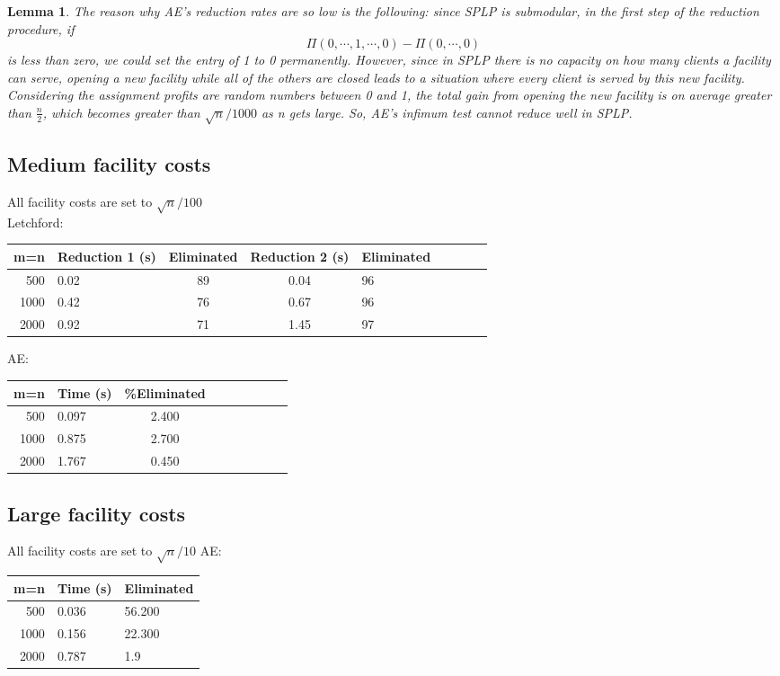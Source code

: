 \documentclass[11pt]{article}
\newtheorem{lemma}[theorem]{Lemma}
\begin{document}
\begin {lemma}
The reason why AE's reduction rates are so low is the following: since SPLP is submodular, in the first step of the reduction procedure, if \[\Pi(0, \cdots, 1, \cdots, 0) - \Pi(0, \cdots, 0)\] is less than zero, we could set the entry of 1 to 0 permanently. However, since in SPLP there is no capacity on how many clients a facility can serve, opening a new facility while all of the others are closed leads to a situation where every client is served by this new facility. Considering the assignment profits are random numbers between 0 and 1, the total gain from opening the new facility is on average greater than $\frac{n}{2}$, which becomes greater than $\sqrt{n}/1000$ as n gets large. So, AE's infimum test cannot reduce well in SPLP.
\end{lemma}

\subsection*{Medium facility costs}
All facility costs are set to $\sqrt{n}/100$\\
Letchford:
\begin{center}
\begin{tabular}{|rlc|clclcl}
  \hline
  m=n & Reduction 1 (s) & Eliminated & Reduction 2 (s) & Eliminated \\ \hline
  500 &0.02& 89& 0.04 & 96\\ \hline
  1000 & 0.42 & 76 & 0.67 & 96\\ \hline
  2000  & 0.92 & 71 & 1.45 & 97\\ \hline
\end{tabular}
\end{center}
AE:
\begin{center}
\begin{tabular}{|rlc|clclcl}
  \hline
  m=n & Time (s) & \%Eliminated \\ \hline
  500 &  0.097 &  2.400  \\ \hline
  1000 & 0.875 & 2.700 \\ \hline
  2000  & 1.767  & 0.450\\ \hline
\end{tabular}
\end{center}

\subsection*{Large facility costs}
All facility costs are set to $\sqrt{n}/10$ 
AE:
\begin{center}
\begin{tabular}{|r|l|l|}
  \hline
  m=n & Time (s) & Eliminated \\ \hline
  500 & 0.036 & 56.200  \\ \hline
  1000 & 0.156 & 22.300\\ \hline
  2000  & 0.787 & 1.9 \\ \hline
\end{tabular}
\end{center}
\end{document}
